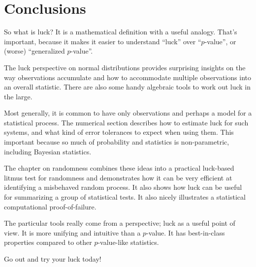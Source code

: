 \chapter{Conclusions}

So what is luck?  It is a mathematical definition with a useful analogy.  That's important, because it makes it easier to understand ``luck'' over ``$p$-value'', or (worse) ``generalized $p$-value''.  

The luck perspective on normal distributions provides surprising insights on the way observations accumulate and how to accommodate multiple observations into an overall statistic.  There are also some handy algebraic tools to work out luck in the large.

Most generally, it is common to have only observations and perhaps a model for a statistical process.  The numerical section describes how to estimate luck for such systems, and what kind of error tolerances to expect when using them.  This important because so much of probability and statistics is non-parametric, including Bayesian statistics.

The chapter on randomness combines these ideas into a practical luck-based litmus test for randomness and demonstrates how it can be very efficient at identifying a misbehaved random process.  It also shows how luck can be useful for summarizing a group of statistical tests.  It also nicely illustrates a statistical computational proof-of-failure.

The particular tools really come from a perspective; luck as a useful point of view.  It is more unifying and intuitive than a $p$-value.  It has best-in-class properties compared to other $p$-value-like statistics.  

Go out and try your luck today!


